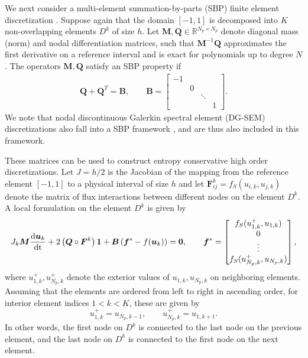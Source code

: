\documentclass{article}
\newcommand{\td}[2]{\frac{{\rm d}#1}{{\rm d}{\rm #2}}}
\newcommand{\LRp}[1]{\left( #1 \right)}
\newcommand{\eqlab}[1]{\begin{align}#1\end{align}}
\newcommand{\bmat}[1]{\begin{bmatrix}#1\end{bmatrix}}
\begin{document}
We next consider a multi-element summation-by-parts (SBP) finite element discretization \cite{kreiss1974finite, carpenter1999stable}.  Suppose again that the domain $[-1,1]$ is decomposed into $K$ non-overlapping elements $D^k$ of size $h$.  Let ${\bm{M}}, {\bm{Q}} \in \mathbb{R}^{N_p\times N_p}$ denote diagonal mass (norm) and nodal differentiation matrices, such that ${\bm{M}}^{-1}{\bm{Q}}$ approximates the first derivative on a reference interval and is exact for polynomials up to degree $N$.  The operators ${\bm{M}}, {\bm{Q}}$ satisfy an SBP property if
\eqlab{
{\bm{Q}}+{\bm{Q}}^T = {\bm{B}}, \qquad 
{\bm{B}} = \bmat{
-1 & & & \\
& 0 & & \\
& & \ddots & \\
& & & 1 
}.
\label{eq:fvQ}
}
We note that nodal discontinuous Galerkin spectral element (DG-SEM) discretizations \cite{kopriva2009implementing} also fall into a SBP framework \cite{gassner2013skew}, and are thus also included in this framework.  

These matrices can be used to construct entropy conservative high order discretizations.  Let $J = h/2$ is the Jacobian of the mapping from the reference element $[-1,1]$ to a physical interval of size $h$ and let $\bm{F}^k_{ij} = f_S(u_{i,k},u_{j,k})$ denote the matrix of flux interactions between different nodes on the element $D^k$.  A local formulation on the element $D^k$ is given by
\eqlab{
J_k {\bm{M}} \td{\bm{u}_k}{t} + 2\LRp{{\bm{Q}} \circ \bm{F}^k}\bm{1} + \bm{B}\LRp{\bm{f}^*-f(\bm{u}_k)}   = \bm{0}, \qquad \bm{f}^* = \bmat{
f_S(u_{1,k}^+,u_{1,k})\\
0\\
\vdots\\
f_S(u_{N_p,k}^+,u_{N_p,k})
},
\label{eq:sbp1D}
}
where $u_{1,k}^+, u_{N_p,k}^+$ denote the exterior values of $u_{1,k}, u_{N_p,k}$ on neighboring elements.  Assuming that the elements are ordered from left to right in ascending order, for interior element indices $1 < k < K$, these are given by
\[
u_{1,k}^+ = u_{N_p,k-1}, \qquad u_{N_p,k}^+ = u_{1,k+1}.
\]
In other words, the first node on $D^k$ is connected to the last node on the previous element, and the last node on $D^k$ is connected to the first node on the next element.
\end{document}
